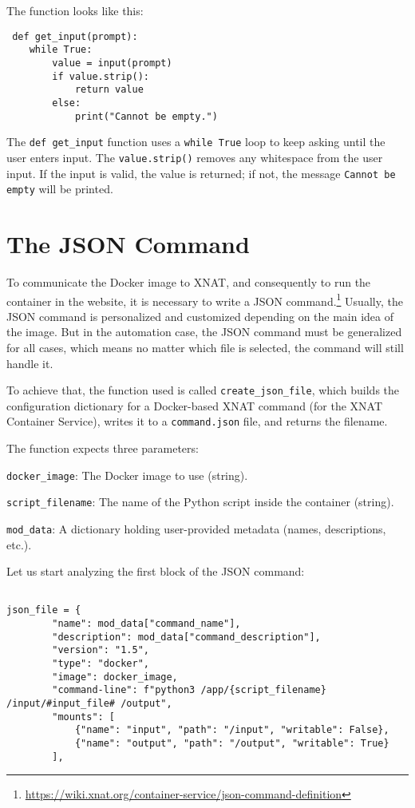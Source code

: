 The function looks like this:
 
 \begin{lstlisting}
 def get_input(prompt):
    while True:
        value = input(prompt)
        if value.strip():
            return value
        else:
            print("Cannot be empty.")

\end{lstlisting}
The \texttt{def get\_input} function uses a \texttt{while True} loop to keep asking until the user enters input. The \texttt{value.strip()} removes any whitespace from the user input. If the input is valid, the value is returned; if not, the message \texttt{Cannot be empty} will be printed.

\section{The JSON Command}

To communicate the Docker image to XNAT, and consequently to run the container in the website, it is necessary to write a JSON command.\footnote{\url{https://wiki.xnat.org/container-service/json-command-definition}}
Usually, the JSON command is personalized and customized depending on the main idea of the image. But in the automation case, the JSON command must be generalized for all cases, which means no matter which file is selected, the command will still handle it.

To achieve that, the function used is called \texttt{create\_json\_file}, which builds the configuration dictionary for a Docker-based XNAT command (for the XNAT Container Service), writes it to a \texttt{command.json} file, and returns the filename.

The function expects three parameters:

\texttt{docker\_image}: The Docker image to use (string).

\texttt{script\_filename}: The name of the Python script inside the container (string).

\texttt{mod\_data}: A dictionary holding user-provided metadata (names, descriptions, etc.).

Let us start analyzing the first block of the JSON command:
\begin{lstlisting}

json_file = {
        "name": mod_data["command_name"],
        "description": mod_data["command_description"],
        "version": "1.5",
        "type": "docker",
        "image": docker_image,
        "command-line": f"python3 /app/{script_filename} /input/#input_file# /output",
        "mounts": [
            {"name": "input", "path": "/input", "writable": False},
            {"name": "output", "path": "/output", "writable": True}
        ],
\end{lstlisting}


